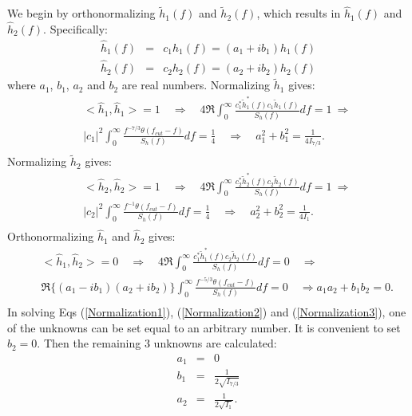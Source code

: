 We begin by orthonormalizing $\tilde{h}_1(f)$ and $\tilde{h}_2(f)$, which 
results in
$\hat{h}_1(f)$ and $\hat{h}_2(f)$.
Specifically:
\begin{eqnarray}
\hat{h}_1(f) &=& c_1 h_1(f) = (a_1 + i b_1) h_1(f) \\
\hat{h}_2(f) &=& c_2 h_2(f) = (a_2 + i b_2) h_2(f)
\end{eqnarray}
where $a_1$, $b_1$, $a_2$ and $b_2$ are real numbers.
Normalizing $\tilde{h}_1$ gives:
\begin{eqnarray}
&& <\hat{h}_1,\hat{h}_1> = 1  \quad \Rightarrow \quad
 4 \Re \int_0^{\infty} \frac{c_1^{\ast} \tilde{h}_1^{\ast}(f) c_1 
\tilde{h}_1(f)}{S_h(f)} df
= 1 \:  \Rightarrow \\
&& |c_1|^2 \int_0^{\infty} \frac{f^{-7/3} \theta(f_{cut} -f)}{S_h(f)} df
= \frac{1}{4} \quad \Rightarrow \quad
 a_1^2 + b_1^2 = \frac{1}{4 I_{7/3}}. \\
\label{Normalization1}
\end{eqnarray}
Normalizing $\tilde{h}_2$ gives:
\begin{eqnarray}
&& <\hat{h}_2,\hat{h}_2> = 1  \quad \Rightarrow \quad
 4 \Re \int_0^{\infty} \frac{c_2^{\ast} \tilde{h}_2^{\ast}(f) c_2 
\tilde{h}_2(f)}{S_h(f)} df
= 1 \:  \Rightarrow \\
&& |c_2|^2 \int_0^{\infty} \frac{f^{-1} \theta(f_{cut} -f)}{S_h(f)} df
= \frac{1}{4} \quad \Rightarrow \quad
 a_2^2 + b_2^2 = \frac{1}{4 I_{1}}. \\
\label{Normalization2}
\end{eqnarray}
Orthonormalizing $\hat{h}_1$ and $\hat{h}_2$ gives:
\begin{eqnarray}
&&<\hat{h}_1,\hat{h}_2> = 0 \quad \Rightarrow \quad
4 \Re \int_0^{\infty} \frac{c_1^{\ast} \tilde{h}_1^{\ast}(f) c_2 
\tilde{h}_2(f)}{S_h(f)} df
= 0 \quad \Rightarrow \quad \\
&& \Re \big \{ (a_1-i b_1)(a_2 +i b_2) \Big \} \int_0^{\infty} \frac{f^{-5/3}
\theta(f_{cut}-f)}{S_h(f)} df = 0 \quad \Rightarrow a_1 a_2+b_1 b_2 =0
. \\
\label{Normalization3}
\end{eqnarray}
In solving Eqs (\ref{Normalization1}), (\ref{Normalization2}) and
(\ref{Normalization3}), one of the unknowns
 can be set equal to an arbitrary number.
It is convenient to set $b_2=0$.
Then the remaining 3 unknowns are calculated:
\begin{eqnarray}
a_1 &=& 0 \\
b_1 &=& \frac{1}{2 \sqrt{I_{7/3}}} \label{b1}\\
a_2 &=& \frac{1}{2 \sqrt{I_1}}.
\label{a2}
\end{eqnarray}

